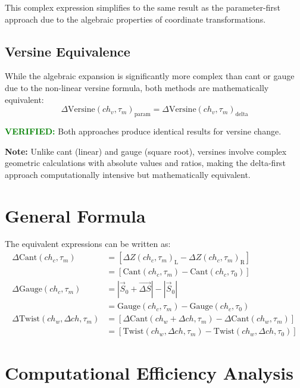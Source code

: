 \documentclass{article}
\newcommand{\chainage}[1]{ch_{#1}}
\newcommand{\Left}{\text{L}}
\newcommand{\Right}{\text{R}}
\newcommand{\DZ}[3]{\Delta Z(#1, #2)_{#3}}
\newcommand{\Cant}[2]{\text{Cant}(#1, #2)}
\newcommand{\DCant}[2]{\Delta\text{Cant}(#1, #2)}
\newcommand{\Gauge}[2]{\text{Gauge}(#1, #2)}
\newcommand{\DGauge}[2]{\Delta\text{Gauge}(#1, #2)}
\newcommand{\Twist}[3]{\text{Twist}(#1, #2, #3)}
\newcommand{\DTwist}[3]{\Delta\text{Twist}(#1, #2, #3)}
\begin{document}
This complex expression simplifies to the same result as the parameter-first approach due to the algebraic properties of coordinate transformations.

\subsection{Versine Equivalence}
While the algebraic expansion is significantly more complex than cant or gauge due to the non-linear versine formula, both methods are mathematically equivalent:
\begin{equation}
\boxed{\Delta\text{Versine}(ch_v, \tau_m)_{\text{param}} = \Delta\text{Versine}(ch_v, \tau_m)_{\text{delta}}}
\end{equation}

\textcolor{green}{\textbf{VERIFIED:}} Both approaches produce identical results for versine change.

\textbf{Note:} Unlike cant (linear) and gauge (square root), versines involve complex geometric calculations with absolute values and ratios, making the delta-first approach computationally intensive but mathematically equivalent.

\section{General Formula}
The equivalent expressions can be written as:
\begin{align}
\DCant{\chainage{c}}{\tau_m} &= \left[\DZ{\chainage{c}}{\tau_m}{\Left} - \DZ{\chainage{c}}{\tau_m}{\Right}\right] \\
&= \left[\Cant{\chainage{c}}{\tau_m} - \Cant{\chainage{c}}{\tau_0}\right] \\
\DGauge{\chainage{c}}{\tau_m} &= |\vec{S}_0 + \vec{\Delta S}| - |\vec{S}_0| \\
&= \Gauge{\chainage{c}}{\tau_m} - \Gauge{\chainage{c}}{\tau_0} \\
\DTwist{\chainage{w}}{\Delta ch}{\tau_m} &= \left[\DCant{\chainage{w} + \Delta ch}{\tau_m} - \DCant{\chainage{w}}{\tau_m}\right] \\
&= \left[\Twist{\chainage{w}}{\Delta ch}{\tau_m} - \Twist{\chainage{w}}{\Delta ch}{\tau_0}\right]
\end{align}

\section{Computational Efficiency Analysis}
\end{document}
